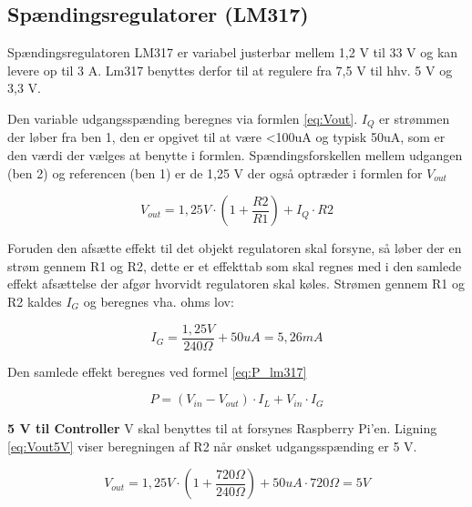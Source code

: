 \subsection{Spændingsregulatorer (LM317)}

Spændingsregulatoren LM317 er variabel justerbar mellem 1,2 V til 33 V og kan levere op til 3 A. Lm317 benyttes derfor til at regulere fra 7,5 V til hhv. 5 V og 3,3 V. 


Den variable udgangsspænding beregnes via formlen \ref{eq:Vout}. $I_{Q}$ er strømmen der løber fra ben 1, den er opgivet til at være <100uA og typisk 50uA, som er den værdi der vælges at benytte i formlen. Spændingsforskellen mellem udgangen (ben 2) og referencen (ben 1) er de 1,25 V der også optræder i formlen for $V_{out}$   

\begin{equation} 
{ V }_{ out }=1,25V\cdot \left( 1+\frac { R2 }{ R1 }  \right) +{ I }_{ Q }\cdot R2
\label{eq:Vout}
\end{equation}

Foruden den afsætte effekt til det objekt regulatoren skal forsyne, så løber der en strøm gennem R1 og R2, dette er et effekttab som skal regnes med i den samlede effekt afsættelse der afgør hvorvidt regulatoren skal køles. Strømen gennem R1 og R2 kaldes $I_{G}$ og beregnes vha. ohms lov:

\begin{equation} 
{ I }_{ G }=\frac { 1,25V }{ 240\Omega  } +50uA=5,26mA
\label{eq:IG}
\end{equation}

Den samlede effekt beregnes ved formel \ref{eq:P_lm317} 

\begin{equation} 
{ P }=({ V }_{ in }-{ V }_{ out })\cdot { I }_{ L }+{ V }_{ in }\cdot { I }_{ G }
\label{eq:P_lm317}
\end{equation}


\textbf{5 V til Controller}  V skal benyttes til at forsynes Raspberry Pi'en. Ligning \ref{eq:Vout5V} viser beregningen af R2 når ønsket udgangsspænding er 5 V.  

\begin{equation} 
{ V }_{ out }=1,25V\cdot \left( 1+\frac { 720\Omega  }{ 240\Omega  }  \right) +50uA\cdot 720\Omega =5V
\label{eq:Vout5V}
\end{equation}

